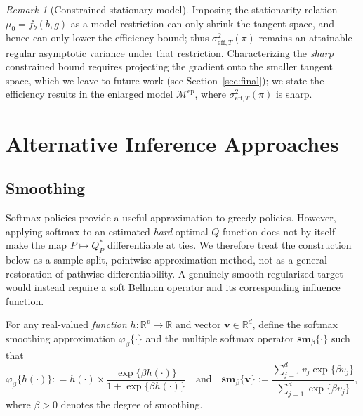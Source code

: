 \documentclass[12pt]{article}
\theoremstyle{remark}\newtheorem{remark}[theorem]{Remark}\theoremstyle{plain}
\newcommand{\sm}{\mathbf{sm}}
\newcommand{\vv}{\mathbf{v}}
\begin{document}
\begin{remark}[Constrained stationary model]
\label{rem:constrained_bound}
    Imposing the stationarity relation $\mu_0=f_b(b,g)$ as a model
    restriction can only shrink the tangent space, and hence can only
    lower the efficiency bound; thus $\sigma^2_{\mathrm{eff},T}(\pi)$
    remains an attainable regular asymptotic variance under that
    restriction.  Characterizing the \emph{sharp} constrained bound
    requires projecting the gradient onto the smaller tangent space,
    which we leave to future work (see Section~\ref{sec:final}); we state
    the efficiency results in the enlarged model
    $\mathcal M^{\mathrm{ep}}$, where $\sigma^2_{\mathrm{eff},T}(\pi)$ is
    sharp.
\end{remark}


\section{Alternative Inference Approaches}\label{sec:alternative}
\subsection{Smoothing}\label{sec:smoothing}

Softmax policies provide a useful approximation to greedy policies.
However, applying softmax to an estimated \emph{hard} optimal
$Q$-function does not by itself make the map
$P\mapsto Q_P^*$ differentiable at ties.  We therefore treat the
construction below as a sample-split, pointwise approximation method,
not as a general restoration of pathwise differentiability.  A
genuinely smooth regularized target would instead require a soft
Bellman operator and its corresponding influence function.



For any real-valued \textit{function} $h: \mathbb{R}^p \rightarrow \mathbb{R}$ and vector $\vv \in \mathbb{R}^d$, define the softmax smoothing approximation $\varphi_{\beta} \{ \cdot \}$ and the multiple softmax operator $\sm_{\beta} \{ \cdot \}$ such that 
\begin{equation}\label{eq:smoothing_operators}
    \varphi_{\beta} \{ h(\cdot)\}: = h(\cdot) \times \frac{\exp\{\beta h(\cdot)\}}{1 + \exp\{\beta h(\cdot)\}} \quad \text{and} \quad \sm_{\beta} \{ \vv \} := \frac{\sum_{j = 1}^d v_j \exp\{\beta v_j\}}{\sum_{j = 1}^d \exp\{\beta v_j\}},
\end{equation}
where $\beta > 0$ denotes the degree of smoothing.
\end{document}
